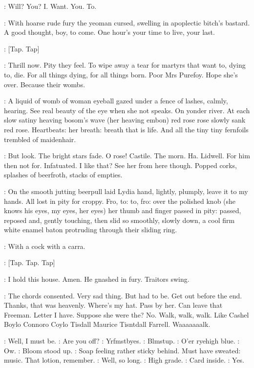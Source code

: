 \BloomInt:
Will? You? I. Want. You. To.

:
With hoarse rude fury the yeoman cursed, swelling in apoplectic
bitch's bastard. A good thought, boy, to come. One hour's your time to
live, your last.

\stripling:
[Tap. Tap]

\BloomInt:
Thrill now. Pity they feel. To wipe away a tear for martyrs that want
to, dying to, die. For all things dying, for all things born. Poor Mrs
Purefoy. Hope she's over. Because their wombs.

\BloomInt:
A liquid of womb of woman eyeball gazed under a fence of lashes,
calmly, hearing. See real beauty of the eye when she not speaks. On yonder
river. At each slow satiny heaving bosom's wave (her heaving embon) red
rose rose slowly sank red rose. Heartbeats: her breath: breath that is
life. And all the tiny tiny fernfoils trembled of maidenhair.

\BloomInt:
But look. The bright stars fade. O rose! Castile. The morn.
Ha.
Lidwell. For him then not for. Infatuated. I like that? See her
from here though. Popped corks, splashes of beerfroth,
stacks of empties.

:
On the smooth jutting beerpull laid Lydia hand, lightly, plumply, leave
it to my hands. All lost in pity for croppy. Fro, to: to, fro: over the
polished knob (she knows his eyes, my eyes, her eyes) her thumb and finger
passed in pity: passed, reposed and, gently touching, then slid so
smoothly, slowly down, a cool firm white enamel baton protruding through
their sliding ring.

\BloomInt:
With a cock with a carra.

\stripling:
[Tap. Tap. Tap]

\BloomInt:
I hold this house. Amen.
He gnashed in fury. Traitors swing.

\BloomInt:
The chords consented. Very sad thing. But had to be. Get out before
the end. Thanks, that was heavenly. Where's my hat. Pass by her. Can
leave that Freeman. Letter I have. Suppose she were the? No. Walk,
walk, walk. Like Cashel Boylo Connoro Coylo Tisdall Maurice Tisntdall
Farrell. Waaaaaaalk.

\BloomInt:
Well, I must be.
\goulding:
Are you off?
\BloomInt:
Yrfmstbyes.
\BloomInt:
Blmstup.
\goulding:
O'er ryehigh blue.
\BloomInt:
Ow.
:
Bloom stood up.
\BloomInt:
Soap feeling rather sticky behind. Must have
sweated: music. That lotion, remember.
\BloomInt:
Well, so long.
\goulding:
High grade.
\BloomInt:
Card inside.
\goulding:
Yes.

